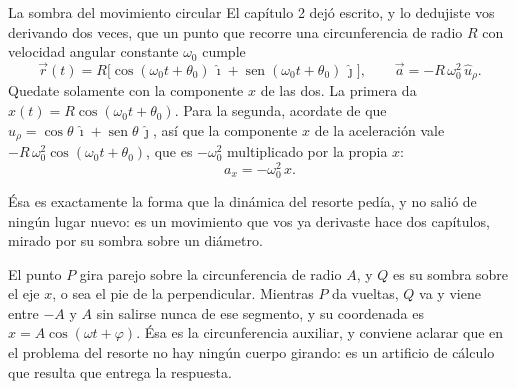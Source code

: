 \documentclass[11pt,openany]{book}
\newcommand{\sen}{\operatorname{sen}}
\begin{document}
\begin{bloque}{La sombra del movimiento circular}
El capítulo 2 dejó escrito, y lo dedujiste vos derivando dos veces, que un punto que recorre una circunferencia de radio $R$ con velocidad angular constante $\omega_0$ cumple
\[
\vec r(t) = R\big[\cos(\omega_0 t+\theta_0)\,\hat\imath + \sen(\omega_0 t+\theta_0)\,\hat\jmath\big],
\qquad
\vec a = -R\,\omega_0^{2}\,\hat u_\rho .
\]
Quedate solamente con la componente $x$ de las dos. La primera da $x(t) = R\cos(\omega_0 t+\theta_0)$. Para la segunda, acordate de que $\hat u_\rho = \cos\theta\,\hat\imath + \sen\theta\,\hat\jmath$, así que la componente $x$ de la aceleración vale $-R\,\omega_0^2\cos(\omega_0 t+\theta_0)$, que es $-\omega_0^2$ multiplicado por la propia $x$:
\[
a_x = -\omega_0^{2}\,x .
\]

Ésa es exactamente la forma que la dinámica del resorte pedía, y no salió de ningún lugar nuevo: es un movimiento que vos ya derivaste hace dos capítulos, mirado por su sombra sobre un diámetro.

\begin{center}
\end{center}

El punto $P$ gira parejo sobre la circunferencia de radio $A$, y $Q$ es su sombra sobre el eje $x$, o sea el pie de la perpendicular. Mientras $P$ da vueltas, $Q$ va y viene entre $-A$ y $A$ sin salirse nunca de ese segmento, y su coordenada es $x = A\cos(\omega t+\varphi)$. Ésa es la circunferencia auxiliar, y conviene aclarar que en el problema del resorte no hay ningún cuerpo girando: es un artificio de cálculo que resulta que entrega la respuesta.


\end{bloque}
\end{document}
